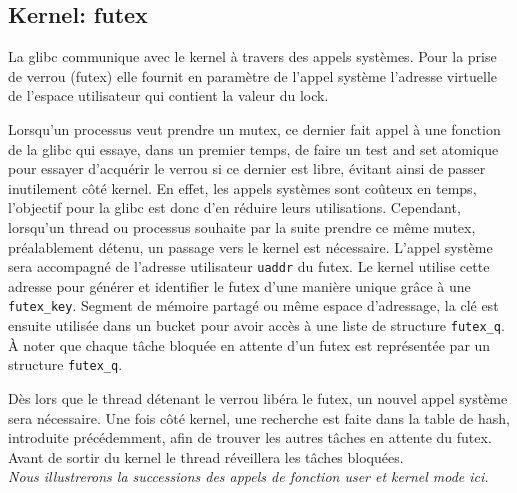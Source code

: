 \subsection{Kernel: futex}

La glibc communique avec le kernel à travers des appels systèmes. Pour la prise de verrou (futex) elle fournit en paramètre de l'appel système l'adresse virtuelle de l'espace utilisateur qui contient la valeur du lock.

Lorsqu'un processus veut prendre un mutex, ce dernier fait appel à une fonction 
de la glibc qui essaye, dans un premier temps, de faire un test and set atomique pour essayer d'acquérir le verrou si ce dernier est libre, évitant ainsi de passer inutilement côté kernel. En effet, les appels systèmes sont coûteux en temps, l'objectif pour la glibc est donc d'en réduire leurs utilisations. Cependant, lorsqu'un thread ou processus souhaite par la suite prendre ce même mutex, préalablement détenu, un passage vers le kernel est nécessaire. L'appel système sera accompagné de l'adresse utilisateur \verb|uaddr| du futex. Le kernel utilise cette adresse pour générer et identifier le futex d'une manière unique grâce à une \verb|futex_key|. Segment de mémoire partagé ou même espace d'adressage, la clé est ensuite utilisée dans un bucket pour avoir accès à une liste de structure \verb|futex_q|. À noter que chaque tâche bloquée en attente d'un futex est représentée par un structure \verb|futex_q|.

Dès lors que le thread détenant le verrou libéra le futex, un nouvel appel système sera nécessaire. Une fois côté kernel, une recherche est faite dans la table de hash, introduite précédemment, afin de trouver les autres tâches en attente du futex. Avant de sortir du kernel le thread réveillera les tâches bloquées.
\\

\textit{Nous illustrerons la successions des appels de fonction user et kernel mode ici.}

